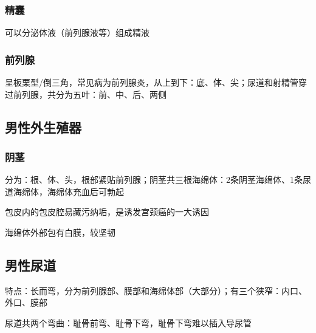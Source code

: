 \subsubsection*{精囊}%
\label{subsub:精囊}
可以分泌体液（前列腺液等）组成精液
\subsubsection*{前列腺}%
\label{subsub:前列腺}
呈板栗型/倒三角，常见病为前列腺炎，从上到下：底、体、尖；尿道和射精管穿过前列腺，共分为五叶：前、中、后、两侧
\subsection{男性外生殖器}%
\label{sub:男性外生殖器}
\subsubsection*{阴茎}%
\label{subsub:阴茎}
分为：根、体、头，根部紧贴前列腺；阴茎共三根海绵体：2条阴茎海绵体、1条尿道海绵体，海绵体充血后可勃起
\begin{notation}
    包皮内的包皮腔易藏污纳垢，是诱发宫颈癌的一大诱因
\end{notation}
海绵体外部包有白膜，较坚韧
\subsection{男性尿道}%
\label{sub:男性尿道}
特点：长而弯，分为前列腺部、膜部和海绵体部（大部分）；有三个狭窄：内口、外口、膜部

尿道共两个弯曲：耻骨前弯、耻骨下弯，耻骨下弯难以插入导尿管
